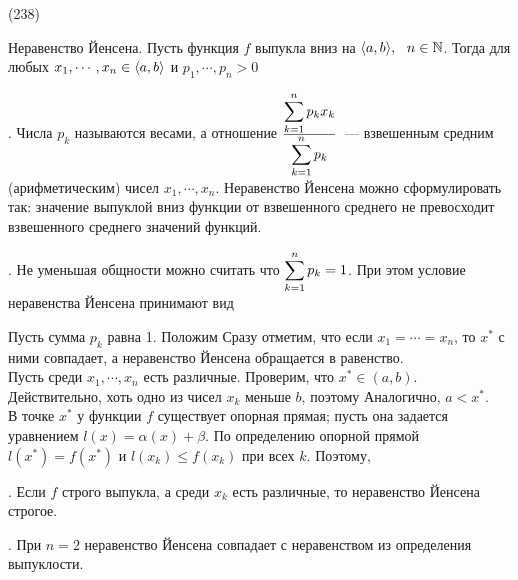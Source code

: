 (238)

\T \q Неравенство Йенсена. Пусть функция $f$ выпукла вниз на $\ang ab,\s n \in \N$. Тогда для любых $x_1,\cdots, x_n \in \ang ab$ и $p_1, \cdots, p_n > 0$ 

. Числа $p_k$ называются весами, а отношение $\frac{\dsl\sum{k = 1}n p_k x_k}{\dsl\sum{k = 1}n p_k} $~--- взвешенным средним (арифметическим) чисел $x_1, \cdots, x_n$. Неравенство Йенсена можно сформулировать так: значение выпуклой вниз функции от взвешенного среднего не превосходит взвешенного среднего значений функций.

. Не уменьшая общности можно считать что $\dsl\sum{k = 1}n p_k =1$. При этом условие неравенства Йенсена принимают вид 

\D Пусть сумма $p_k$ равна 1. Положим  Сразу отметим, что если $x_1 = \cdots = x_n$, то $x^*$ с ними совпадает, а неравенство Йенсена обращается в равенство.\\
Пусть среди $x_1,\cdots, x_n$ есть различные. Проверим, что $x^* \in (a, b)$. Действительно, хоть одно из чисел $x_k$ меньше $b$, поэтому  Аналогично, $a < x^*$.\\

В точке $x^*$ у функции $f$ существует опорная прямая; пусть она задается уравнением $l(x) = \alpha(x) + \beta$. По определению опорной прямой $l(x^*) = f(x^*)$ и $l(x_k) \le f(x_k)$ при всех $k$. Поэтому, 

. Если $f$ строго выпукла, а среди $x_k$ есть различные, то неравенство Йенсена строгое.

\Zam. При $n = 2$ неравенство Йенсена совпадает с неравенством из определения выпуклости.